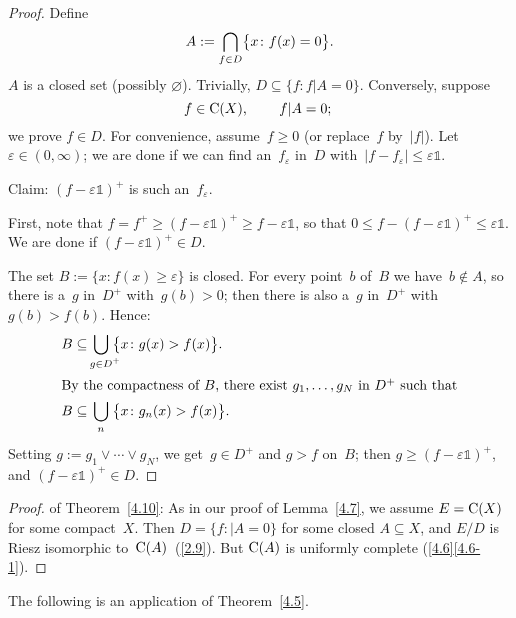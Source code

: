 \documentclass[main.tex]{subfiles}
\begin{document}
\begin{proof}
Define
\begin{equation*}
A := \bigcap_{f\in D} \bigl\{ x\colon f(x)=0 \bigr\}\text{.}
\end{equation*}
$A$ is a closed set (possibly $\varnothing$).
Trivially, $D\subseteq\{ f\colon f|A=0\}$.
Conversely, suppose
\begin{equation*}
f\in \mathrm{C}(X)\text{, }\qquad f|A=0\text{; }
\end{equation*}
we prove $f\in D$.
For convenience,
assume~$f\geq 0$
(or replace~$f$ by~$|f|$).
Let~$\varepsilon\in(0,\infty)$;
we are done if we can find an~$f_\varepsilon$ in~$D$
with~$|f-f_\varepsilon|\leq \varepsilon\mathbb{1}$.

Claim:
$(f-\varepsilon\mathbb{1})^+$ is such an~$f_\varepsilon$.

First,
note that $f=f^+\geq (f-\varepsilon\mathbb{1})^+ 
\geq f-\varepsilon\mathbb{1}$,
so that $0\leq f - (f-\varepsilon \mathbb{1})^+ 
\leq \varepsilon \mathbb{1}$.
We are done if $(f-\varepsilon \mathbb{1})^+\in D$.

The set $B:=\{ x\colon f(x)\geq \varepsilon \}$ is closed.
For every point~$b$ of~$B$
we have~$b\notin A$,
so there is a~$g$ in~$D^+$ with~$g(b)>0$;
then there is also a~$g$ in~$D^+$
with $g(b)>f(b)$.
Hence:
\begin{align*}
B \subseteq &\bigcup_{\lsub{g\in D^+}{g\in D}} 
\bigl\{ x\colon g(x) > f(x) \bigr\}\htam{.}\\
\intertext{%
By the compactness of~$B$,
there exist $g_1,\dotsc,g_N$ in~$D^+$ such that}
B \subseteq &\bigcup_{\lsub{\phantom{g}\,n}{g\in D}} 
\bigl\{ x\colon g_n(x)>f(x) \bigr\}\htam{.}%
\end{align*}
Setting $g:=g_1\vee \dotsb \vee g_N$,
we get~$g\in D^+$
and $g>f$ on~$B$;
then $g\geq(f-\varepsilon\mathbb{1})^+$,
and $(f-\varepsilon \mathbb{1})^+ \in D$. \xqed
\end{proof}
\begin{proof} of Theorem~\ref{4.10}:
As in our proof of Lemma~\ref{4.7},
we assume $E=\mathrm{C}(X)$ for some compact~$X$.
Then $D=\{ f\colon |A = 0 \}$ for some closed $A\subseteq X$,
and $E/D$ is Riesz isomorphic to~$\mathrm{C}(A)$~(\ref{2.9}).
But $\mathrm{C}(A)$ is uniformly complete (\ref{4.6}\ref{4.6-1}). \xqed
\end{proof}
%
%
\noindent The following is an application of Theorem~\ref{4.5}.
\end{document}
